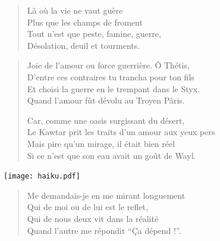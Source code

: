 \begin{verse}
Là où la vie ne vaut guère\\
Plus que les champs de froment\\
Tout n’est que peste, famine, guerre,\\
Désolation, deuil et tourments.
\end{verse}

\begin{verse}
Joie de l’amour ou force guerrière. Ô Thétis,\\
D'entre ces contraires tu trancha pour ton fils\\
Et choisi la guerre en le trempant dans le Styx.\\
Quand l’amour fût dévolu au Troyen Pâris.

Car, comme une oasis surgissant du désert,\\
Le Kawtar prit les traits d’un amour aux yeux pers\\
Mais pire qu’un mirage, il était bien réel\\
Si ce n’est que son eau avait un goût de Wayl.
\end{verse}

\begin{floatpoem}
\hspace{-0.7cm}\texttt{[image: haiku.pdf]}
\end{floatpoem}

\begin{verse}
Me demandais-je en me mirant longuement\\
Qui de moi ou de lui est le reflet,\\
Qui de nous deux vit dans la réalité\\
Quand l’autre me répondit \enquote{Ça dépend !}.
\end{verse}

\afterpage{}
